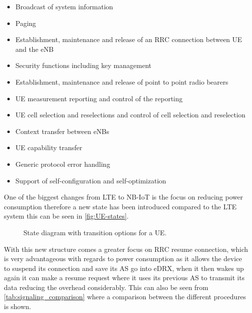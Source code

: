 \begin{itemize}
	\item Broadcast of system information
	\item Paging
	\item Establishment, maintenance and release of an \gls{RRC} connection between \gls{UE} and the \gls{eNB}
	\item Security functions including key management
	\item Establishment, maintenance and release of point to point radio bearers
	\item \gls{UE} measurement reporting and control of the reporting
	\item \gls{UE} cell selection and reselections and control of cell selection and reselection
	\item Context transfer between \gls{eNB}s
	\item \gls{UE} capability transfer
	\item Generic protocol error handling
	\item Support of self-configuration and self-optimization
\end{itemize}

One of the biggest changes from \gls{LTE} to \gls{NB-IoT} is the focus on reducing power consumption therefore a new state has been introduced compared to the \gls{LTE} system this can be seen in \autoref{fig:UE-states}.

\begin{figure}[H]
\centering

\caption{State diagram with transition options for a \gls{UE}.}
\label{fig:UE-states}
\end{figure}


With this new structure comes a greater focus on \gls{RRC} resume connection, which is very advantageous with regards to power consumption as it allows the device to suspend its connection and save its \gls{AS} go into \gls{eDRX}, when it then wakes up again it can make a resume request where it uses its previous \gls{AS} to transmit its data reducing the overhead considerably. This can also be seen from \autoref{tab:signaling_comparison} where a comparison between the different procedures is shown. 

